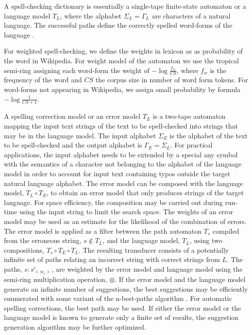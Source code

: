 \documentclass[postprint]{flammie}
\begin{document}
A spell-checking dictionary is essentially a single-tape finite-state
automaton or a language model $T_L$, where the alphabet $\Sigma_L =
\Gamma_L$ are characters of a natural language. The successful paths
define the correctly spelled word-forms of the language
\cite{pirinen2010finitestate}. 

For weighted spell-checking, we define the weights in lexicon as
as probability of the word in Wikipedia. For weight model of the automaton
we use the tropical semi-ring assigning each word-form the weight of
$-\log \frac{f_w}{CS}$, where $f_w$ is the frequency of the word and $CS$
the corpus size in number of word form tokens. For word-forms not appearing
in Wikipedia, we assign small probability by formula $-\log \frac{1}{CS+1}$.

A spelling correction model or an error model $T_E$ is a two-tape
automaton mapping the input text strings of the text to be
spell-checked into strings that may be in the language model. The
input alphabet $\Sigma_E$ is the alphabet of the text to be
spell-checked and the output alphabet is $\Gamma_E = \Sigma_L$. For
practical applications, the input alphabet needs to be extended by a
special any symbol with the semantics of a character not belonging to
the alphabet of the language model in order to account for input text
containing typos outside the target natural language alphabet. The
error model can be composed with the language model, $T_L \circ T_E$,
to obtain an error model that only produces strings of the target
language. For space efficiency, the composition may be carried out
during run-time using the input string to limit the search space. The
weights of an error model may be used as an estimate for the likelihood of the
combination of errors. The error model is applied as a filter between
the path automaton $T_s$ compiled from the erroneous string, $s \notin
T_L$, and the language model, $T_L$, using two compositions, $T_s
\circ T_E \circ T_L$. The resulting transducer consists of a
potentially infinite set of paths relating an incorrect string with
correct strings from $L$. The paths, $s:s^i_{<w_i>}$, are weighted by
the error model and language model using the semi-ring multiplication
operation, $\otimes$. If the error model and the language model
generate an infinite number of suggestions, the best suggestions may
be efficiently enumerated with some variant of the n-best-paths
algorithm \cite{mohri2002efficient}. For automatic spelling corrections, the
best path may be used. If either the error model or the language model
is known to generate only a finite set of results, the suggestion
generation algorithm may be further optimized.
\end{document}
